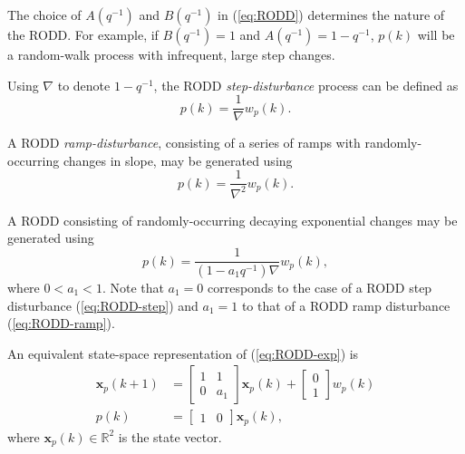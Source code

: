 The choice of $A(q^{-1})$ and $B(q^{-1})$ in (\ref{eq:RODD}) determines the nature of the \gls{RODD}. For example, if $B(q^{-1})=1$ and $A(q^{-1})=1-q^{-1}$, $p(k)$ will be a random-walk process with infrequent, large step changes.

Using $\nabla$ to denote $1-q^{-1}$, the \gls{RODD} \textit{step-disturbance} process can be defined as
%
\begin{equation} \label{eq:RODD-step}
	p(k) = \frac{1}{\nabla}w_p(k).
\end{equation}

A \gls{RODD} \textit{ramp-disturbance}, consisting of a series of ramps with randomly-occurring changes in slope, may be generated using
\begin{equation} \label{eq:RODD-ramp}
	p(k) = \frac{1}{\nabla^2}w_p(k).
\end{equation}

A \gls{RODD} consisting of randomly-occurring decaying exponential changes may be generated using
\begin{equation} \label{eq:RODD-exp}
	p(k) = \frac{1}{(1-a_1q^{-1})\nabla}w_p(k),
\end{equation}
where  $0<a_1<1$. Note that $a_1=0$ corresponds to the case of a \gls{RODD} step disturbance (\ref{eq:RODD-step}) and $a_1=1$ to that of a \gls{RODD} ramp disturbance (\ref{eq:RODD-ramp}). 

An equivalent state-space representation of (\ref{eq:RODD-exp}) is
\begin{equation} \label{eq:RODD-ss}
	\begin{split}
		\mathbf{x}_p(k+1) & =\left[\begin{array}{cc}
			1 & 1 \\
			0 & a_1
		\end{array}\right] \mathbf{x}_p(k) +\left[\begin{array}{cc}
			0 \\
			1
		\end{array}\right] w_p(k) \\
		p(k) & =\left[\begin{array}{cc}
			1 & 0
		\end{array}\right] \mathbf{x}_p(k),
	\end{split}
\end{equation}
where $\mathbf{x}_p(k) \in \mathbb{R}^2$ is the state vector.

